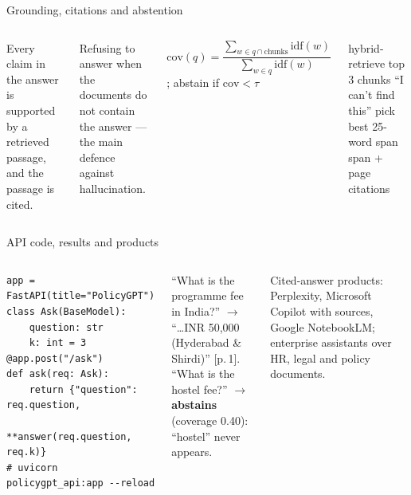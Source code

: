 \documentclass[aspectratio=169,11pt]{beamer}
\begin{document}
\begin{frame}{Grounding, citations and abstention}
\begin{columns}[T]
\begin{bdef}
Every claim in the answer is supported by a retrieved passage, and the passage is cited.
\end{bdef}
\begin{bdef}[Abstention]
Refusing to answer when the documents do not contain the answer --- the main defence against hallucination.
\end{bdef}
\begin{bmath}[Coverage]
$\mathrm{cov}(q)=\dfrac{\sum_{w\in q\cap\text{chunks}}\mathrm{idf}(w)}{\sum_{w\in q}\mathrm{idf}(w)}$; \; abstain if $\mathrm{cov}<\tau$
\end{bmath}
\begin{balgo}
\begin{algorithmic}[1]
\State hybrid-retrieve top 3 chunks
  \State \Return ``I can't find this''
\EndIf
\State pick best 25-word span
\State \Return span + page citations
\end{algorithmic}
\end{balgo}
\end{columns}
\end{frame}

\begin{frame}[fragile]{API code, results and products}
\begin{columns}[T]
\begin{bcode}
\begin{lstlisting}
app = FastAPI(title="PolicyGPT")
class Ask(BaseModel):
    question: str
    k: int = 3
@app.post("/ask")
def ask(req: Ask):
    return {"question": req.question,
            **answer(req.question, req.k)}
# uvicorn policygpt_api:app --reload
\end{lstlisting}
\end{bcode}
\begin{bres}
``What is the programme fee in India?'' $\rightarrow$ ``\ldots INR 50,000 (Hyderabad \& Shirdi)'' [p.\,1].\\[2pt]
``What is the hostel fee?'' $\rightarrow$ \textbf{abstains} (coverage 0.40): ``hostel'' never appears.
\end{bres}
\begin{bapp}
Cited-answer products: Perplexity, Microsoft Copilot with sources, Google NotebookLM; enterprise assistants over HR, legal and policy documents.
\end{bapp}
\end{columns}
\end{frame}
\end{document}
